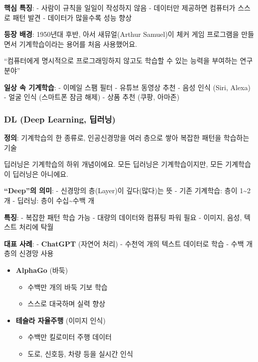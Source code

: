 \documentclass[a4paper, 11pt]{article}
\providecommand{\tightlist}{%
  \setlength{\itemsep}{0pt}\setlength{\parskip}{0pt}}
\renewenvironment{quote}
  {\begin{tcolorbox}[colback=lightblue!30, colframe=mainblue!50,
   left=8pt, right=8pt, top=4pt, bottom=4pt, breakable]}
  {\end{tcolorbox}}
\begin{document}
\textbf{핵심 특징}: - 사람이 규칙을 일일이 작성하지 않음 - 데이터만
제공하면 컴퓨터가 스스로 패턴 발견 - 데이터가 많을수록 성능 향상

\textbf{등장 배경}: 1950년대 후반, 아서 새뮤얼(Arthur Samuel)이 체커
게임 프로그램을 만들면서 기계학습이라는 용어를 처음 사용했어요.

\begin{quote}
``컴퓨터에게 명시적으로 프로그래밍하지 않고도 학습할 수 있는 능력을
부여하는 연구 분야''
\end{quote}

\textbf{일상 속 기계학습}: - 이메일 스팸 필터 - 유튜브 동영상 추천 -
음성 인식 (Siri, Alexa) - 얼굴 인식 (스마트폰 잠금 해제) - 상품 추천
(쿠팡, 아마존)

\hypertarget{dl-deep-learning-uxb525uxb7ecuxb2dd}{%
\subsubsection{ DL (Deep Learning,
딥러닝)}\label{dl-deep-learning-uxb525uxb7ecuxb2dd}}

\textbf{정의}: 기계학습의 한 종류로, 인공신경망을 여러 층으로 쌓아
복잡한 패턴을 학습하는 기술

딥러닝은 기계학습의 하위 개념이에요. 모든 딥러닝은 기계학습이지만, 모든
기계학습이 딥러닝은 아니에요.

\textbf{``Deep''의 의미}: - 신경망의 층(Layer)이 깊다(많다)는 뜻 - 기존
기계학습: 층이 1\textasciitilde2개 - 딥러닝: 층이
수십\textasciitilde 수백 개

\textbf{특징}: - 복잡한 패턴 학습 가능 - 대량의 데이터와 컴퓨팅 파워
필요 - 이미지, 음성, 텍스트 처리에 탁월

\textbf{대표 사례}: - \textbf{ChatGPT} (자연어 처리) - 수천억 개의
텍스트 데이터로 학습 - 수백 개 층의 신경망 사용

\begin{itemize}
\tightlist
\item
  \textbf{AlphaGo} (바둑)

  \begin{itemize}
  \tightlist
  \item
    수백만 개의 바둑 기보 학습
  \item
    스스로 대국하며 실력 향상
  \end{itemize}
\item
  \textbf{테슬라 자율주행} (이미지 인식)

  \begin{itemize}
  \tightlist
  \item
    수백만 킬로미터 주행 데이터
  \item
    도로, 신호등, 차량 등을 실시간 인식
  \end{itemize}
\end{itemize}
\end{document}
